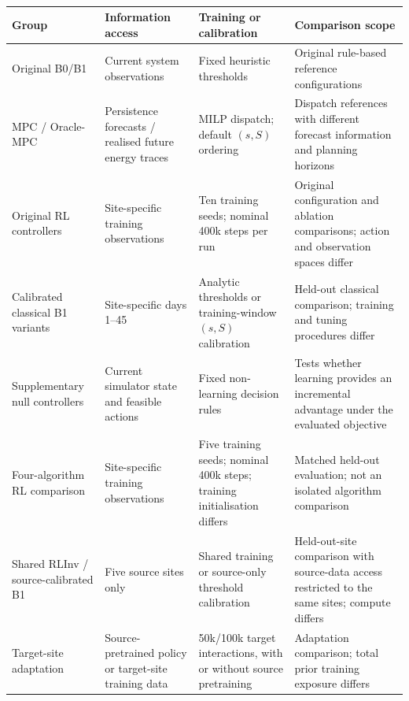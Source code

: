 \begin{table}[htbp]
\centering
\footnotesize
\setlength{\tabcolsep}{4pt}
\renewcommand{\arraystretch}{1.18}
\caption{}
\label{tab:comparison_fairness}
\begin{tabularx}{\textwidth}{
p{2.1cm}
p{3.1cm}
p{3.1cm}
X
}
\toprule
\textbf{Group} &
\textbf{Information access} &
\textbf{Training or calibration} &
\textbf{Comparison scope} \\
\midrule

Original B0/B1 &
Current system observations &
Fixed heuristic thresholds &
Original rule-based reference configurations \\

MPC / Oracle-MPC &
Persistence forecasts / realised future energy traces &
MILP dispatch; default $(s,S)$ ordering &
Dispatch references with different forecast information
and planning horizons \\

Original RL controllers &
Site-specific training observations &
Ten training seeds; nominal 400k steps per run &
Original configuration and ablation comparisons;
action and observation spaces differ \\

Calibrated classical B1 variants &
Site-specific days 1--45 &
Analytic thresholds or training-window
$(s,S)$ calibration &
Held-out classical comparison;
training and tuning procedures differ \\

Supplementary null controllers &
Current simulator state and feasible actions &
Fixed non-learning decision rules &
Tests whether learning provides an incremental
advantage under the evaluated objective \\

Four-algorithm RL comparison &
Site-specific training observations &
Five training seeds; nominal 400k steps;
training initialisation differs &
Matched held-out evaluation;
not an isolated algorithm comparison \\

Shared RLInv / source-calibrated B1 &
Five source sites only &
Shared training or source-only threshold calibration &
Held-out-site comparison with source-data access
restricted to the same sites; compute differs \\

Target-site adaptation &
Source-pretrained policy or target-site training data &
50k/100k target interactions, with or without
source pretraining &
Adaptation comparison; total prior training
exposure differs \\

\bottomrule
\end{tabularx}
\end{table}

